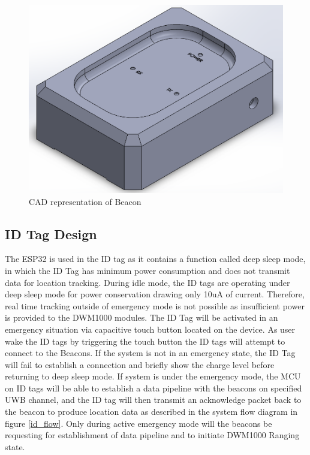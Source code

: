 \bigskip
\begin{figure}[H]
\centering
    \includegraphics[width=\linewidth]{./images/Beacon.png}
    \caption{CAD representation of Beacon}
    \label{Bcn_CAD}
\end{figure}



\pagebreak
\subsection{ID Tag Design}
\medskip
The ESP32 is used in the ID tag as it contains a function called deep sleep mode, in which the ID Tag has minimum power consumption and does not transmit data for location tracking. During idle mode, the ID tags are operating under deep sleep mode for power conservation drawing only 10uA of current. Therefore, real time tracking outside of emergency mode is not possible as insufficient power is provided to the DWM1000 modules. The ID Tag will be activated in an emergency situation via capacitive touch button located on the device. As user wake the ID tags by triggering the touch button the ID tags will attempt to connect to the Beacons. If the system is not in an emergency state, the ID Tag will fail to establish a connection and briefly show the charge level before returning to deep sleep mode. If system is under the emergency mode, the MCU on ID tags will be able to establish a data pipeline with the beacons on specified UWB channel, and the ID tag will then transmit an acknowledge packet back to the beacon to produce location data as described in the system flow diagram in figure \ref{id_flow}. Only during active emergency mode will the beacons be requesting for establishment of data pipeline and to initiate DWM1000 Ranging state.

